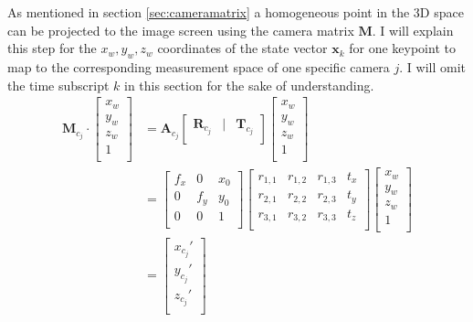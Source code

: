 As mentioned in section \ref{sec:cameramatrix} a homogeneous point in the 3D space can be projected to the image screen using the camera matrix $\mathbf{M}$. I will explain this step for the $x_w,y_w,z_w$ coordinates of the state vector $\mathbf{x}_k$ for one keypoint to map to the corresponding measurement space of one specific camera $j$. I will omit the time subscript $k$ in this section for the sake of understanding. 
\begin{align} 
\mathbf{M}_{c_j} \cdot 
\begin{bmatrix}
x_w \\
y_w \\
z_w \\
1 \\
\end{bmatrix} &= 
\mathbf{A}_{c_j} \begin{bmatrix}
\mathbf{R}_{c_j}&|&\mathbf{T}_{c_j} \\
\end{bmatrix}
\begin{bmatrix}
x_w \\
y_w \\
z_w \\
1 \\
\end{bmatrix} \\
& = 
\begin{bmatrix}
f_x & 0 & x_0 \\
0 & f_y & y_0 \\
0 & 0 & 1\\
\end{bmatrix} 
\begin{bmatrix}
r_{1,1} & r_{1,2} & r_{1,3}& t_x \\
r_{2,1} & r_{2,2} & r_{2,3}& t_y \\
r_{3,1} & r_{3,2} & r_{3,3}& t_z \\
\end{bmatrix}
\begin{bmatrix}
x_w \\
y_w \\
z_w \\
1 \\
\end{bmatrix} \\
& = 
\begin{bmatrix}\label{eq:homogenous}
x_{c_j}' \\
y_{c_j}' \\
z_{c_j}' \\
\end{bmatrix}
\end{align}
